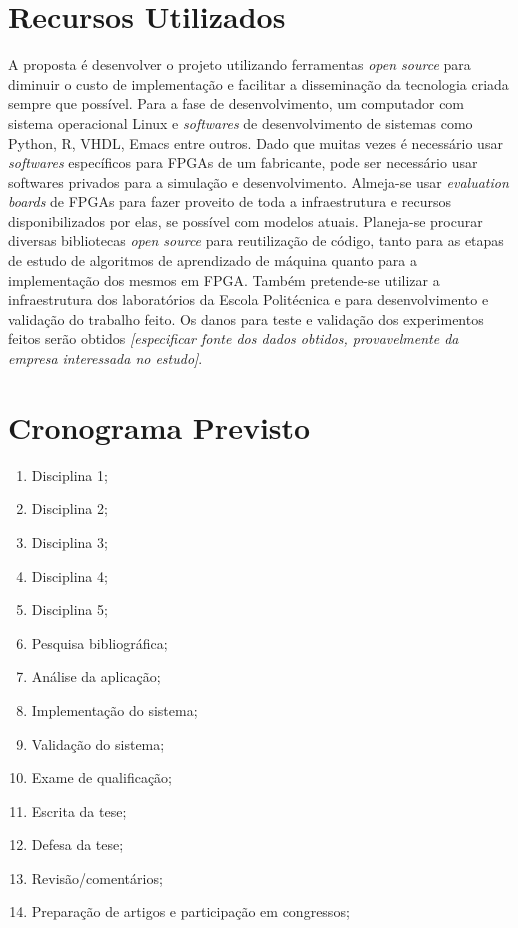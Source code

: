 \documentclass[
	12pt,				%
	oneside,			%
	a4paper,			%
	english,			%
	french,				%
	spanish,			%
	brazil,				%
	]{abntex2}
\begin{document}
\chapter*[Recursos Utilizados]{Recursos Utilizados}
A proposta é desenvolver o projeto utilizando ferramentas \textit{open
 source} para diminuir o custo de implementação e facilitar a
disseminação da tecnologia criada sempre que possível.
Para a fase de desenvolvimento, um computador com sistema operacional
Linux e \textit{softwares} de desenvolvimento de sistemas como Python,
R, VHDL, Emacs entre outros. Dado que muitas vezes é necessário usar
\textit{softwares} específicos para FPGAs de um fabricante, pode ser
necessário usar softwares privados para a simulação e desenvolvimento.
Almeja-se usar \textit{evaluation boards} de FPGAs para fazer proveito
de toda a infraestrutura e recursos disponibilizados por elas, se
possível com modelos atuais. Planeja-se procurar diversas bibliotecas
\textit{open source} para reutilização de código, tanto para as etapas
de estudo de algoritmos de aprendizado de máquina quanto para a
implementação dos mesmos em FPGA. Também pretende-se utilizar a
infraestrutura dos laboratórios da Escola Politécnica e para
desenvolvimento e validação do trabalho feito. Os danos para teste e validação dos experimentos feitos serão obtidos \textit{[especificar fonte dos dados obtidos, provavelmente da empresa interessada no estudo]}.
        
\chapter*[Cronograma Previsto]{Cronograma Previsto}
\begin{enumerate}
	\item Disciplina 1; %
	\item Disciplina 2; %
	\item Disciplina 3; %
	\item Disciplina 4; %
	\item Disciplina 5; %
	\item Pesquisa bibliográfica; %
	\item Análise da aplicação; %
	\item Implementação do sistema; %
	\item Validação do sistema; %
	\item Exame de qualificação; %
	\item Escrita da tese; %
	\item Defesa da tese; %
	\item Revisão/comentários; %
	\item Preparação de artigos e participação em congressos; %
\end{enumerate}
\end{document}
